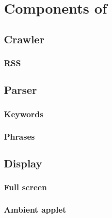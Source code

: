 \chapter[Components]{Components of \AmbE}


\section{Crawler}

\subsection{RSS}


\section{Parser}

\subsection{Keywords}

\subsection{Phrases}


\section{Display}

\subsection{Full screen}

\subsection{Ambient applet}

